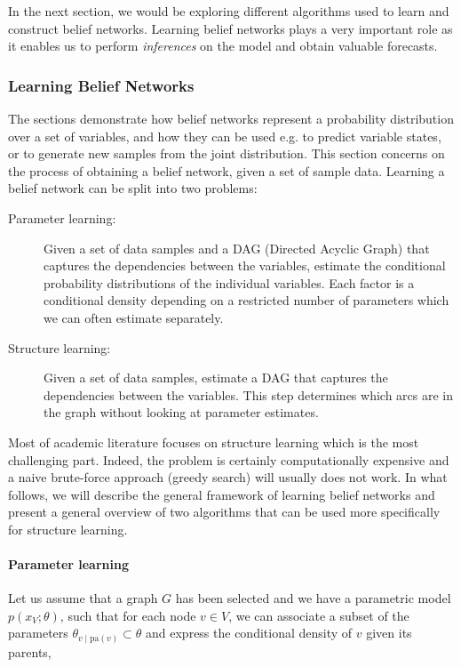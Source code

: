 In the next section, we would be exploring different algorithms used to learn and construct belief networks. Learning belief networks plays a very important role as it enables us to perform \textit{inferences} on the model and obtain valuable forecasts.

\subsubsection{Learning Belief Networks}
\label{learn}

The sections demonstrate how belief networks represent a probability distribution over a set of variables, and how they can be used e.g. to predict variable states, or to generate new samples from the joint distribution. This section concerns on the process of obtaining a belief network, given a set of sample data. Learning a belief network can be split into two problems:\\

\begin{description}
	\item[Parameter learning:]{Given a set of data samples and a DAG (Directed Acyclic Graph) that captures the dependencies between the variables, estimate the conditional probability distributions of the individual variables. Each factor is a conditional density depending on a restricted number of parameters which we can often estimate separately.}
	\item[Structure learning:]{Given a set of data samples, estimate a DAG that captures the dependencies between the variables. This step determines which arcs are in the graph without looking at parameter estimates.}
\end{description}

Most of academic literature focuses on structure learning which is the most challenging part. Indeed, the problem is certainly computationally expensive and a naive brute-force approach (greedy search) will usually does not work. In what follows, we will describe the general framework of learning belief networks and present a general overview of two algorithms that can be used more specifically for structure learning.

\paragraph{Parameter learning}

Let us assume that a graph $G$ has been selected and we have a parametric model $p(x_V;\theta)$, such that for each node $v \in V$, we can associate a subset of the parameters $\theta_{v\mid\text{pa}(v)}\subset \theta$ and express the conditional density of $v$ given its parents,

